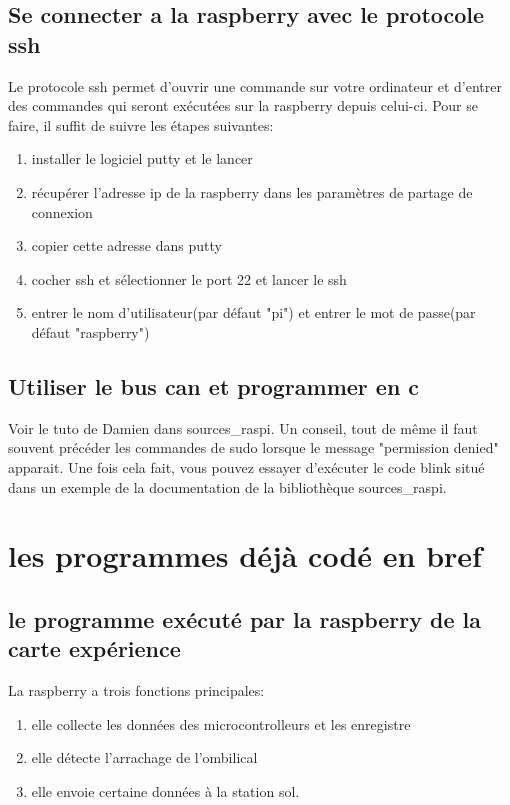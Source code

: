 \documentclass{article}
\begin{document}
\subsection*{Se connecter a la raspberry avec le protocole ssh}
Le protocole ssh permet d'ouvrir une commande sur votre ordinateur et d'entrer des commandes qui seront
exécutées sur la raspberry depuis celui-ci. Pour se faire, il suffit de suivre les étapes suivantes:
\begin{enumerate}
\item installer le logiciel putty et le lancer
\item récupérer l'adresse ip de la raspberry dans les paramètres de partage de connexion
\item copier cette adresse dans putty
\item cocher ssh et sélectionner le port 22 et lancer le ssh
\item entrer le nom d'utilisateur(par défaut "pi") et entrer le mot de passe(par défaut "raspberry")
\end{enumerate}

\subsection*{Utiliser le bus can et programmer en c}
Voir le tuto de Damien dans sources\_raspi. Un conseil, tout de même il faut souvent précéder les
commandes de sudo lorsque le message "permission denied" apparait. Une fois cela fait, vous pouvez essayer
d'exécuter le code blink situé dans un exemple de la documentation de la bibliothèque sources\_raspi.
 
\section{les programmes déjà codé en bref}
\subsection{le programme exécuté par la raspberry de la carte expérience}
La raspberry a trois fonctions principales:
\begin{enumerate}
\item elle collecte les données des microcontrolleurs et les enregistre
\item elle détecte l'arrachage de l'ombilical
\item elle envoie certaine données à la station sol.
\end{enumerate}
\end{document}
